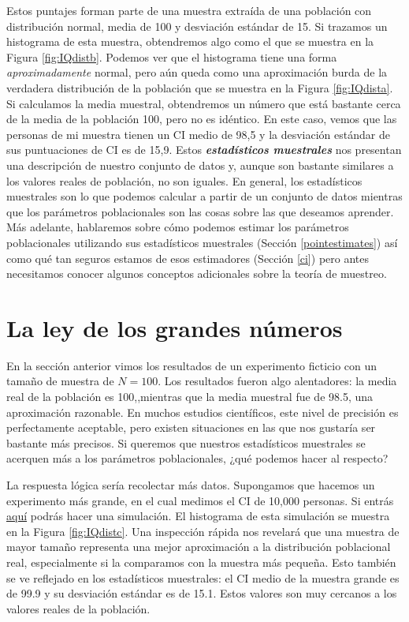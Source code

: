 \documentclass[spanish,]{book}
\begin{document}
Estos puntajes forman parte de una muestra extraída de una población con
distribución normal, media de 100 y desviación estándar de 15. Si
trazamos un histograma de esta muestra, obtendremos algo como el que se
muestra en la Figura \ref{fig:IQdistb}. Podemos ver que el histograma
tiene una forma \emph{aproximadamente} normal, pero aún queda como una
aproximación burda de la verdadera distribución de la población que se
muestra en la Figura \ref{fig:IQdista}. Si calculamos la media muestral,
obtendremos un número que está bastante cerca de la media de la
población 100, pero no es idéntico. En este caso, vemos que las personas
de mi muestra tienen un CI medio de 98,5 y la desviación estándar de sus
puntuaciones de CI es de 15,9. Estos \textbf{\emph{estadísticos
muestrales}} nos presentan una descripción de nuestro conjunto de datos
y, aunque son bastante similares a los valores reales de población, no
son iguales. En general, los estadísticos muestrales son lo que podemos
calcular a partir de un conjunto de datos mientras que los parámetros
poblacionales son las cosas sobre las que deseamos aprender. Más
adelante, hablaremos sobre cómo podemos estimar los parámetros
poblacionales utilizando sus estadísticos muestrales (Sección
\ref{pointestimates}) así como qué tan seguros estamos de esos
estimadores (Sección \ref{ci}) pero antes necesitamos conocer algunos
conceptos adicionales sobre la teoría de muestreo.

\section{La ley de los grandes números}\label{lawlargenumbers}

En la sección anterior vimos los resultados de un experimento ficticio
con un tamaño de muestra de \(N=100\). Los resultados fueron algo
alentadores: la media real de la población es 100,,mientras que la media
muestral fue de 98.5, una aproximación razonable. En muchos estudios
científicos, este nivel de precisión es perfectamente aceptable, pero
existen situaciones en las que nos gustaría ser bastante más precisos.
Si queremos que nuestros estadísticos muestrales se acerquen más a los
parámetros poblacionales, ¿qué podemos hacer al respecto?

La respuesta lógica sería recolectar más datos. Supongamos que hacemos
un experimento más grande, en el cual medimos el CI de 10,000 personas.
Si entrás \href{https://leudave.shinyapps.io/sampling/}{aquí} podrás
hacer una simulación. El histograma de esta simulación se muestra en la
Figura \ref{fig:IQdistc}. Una inspección rápida nos revelará que una
muestra de mayor tamaño representa una mejor aproximación a la
distribución poblacional real, especialmente si la comparamos con la
muestra más pequeña. Esto también se ve reflejado en los estadísticos
muestrales: el CI medio de la muestra grande es de 99.9 y su desviación
estándar es de 15.1. Estos valores son muy cercanos a los valores reales
de la población.
\end{document}
